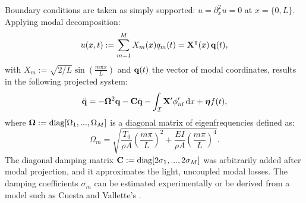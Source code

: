 Boundary conditions are taken as simply supported: $u = \partial_x^2 u = 0$ at $x = \{0, L\}$. Applying modal decomposition:
\begin{equation}\label{eq:ModalSystem}
u(x,t) := \sum_{m=1}^M X_m(x) q_m(t) = {\bf X}^\intercal(x) \, {\bf q}(t),
\end{equation}
with $X_m := \sqrt{2/L} \sin\left(\frac{m\pi x}{L}\right)$ and ${\bf q}(t)$ the vector of modal coordinates, results in the following projected system:
\begin{equation}
\ddot {\bf q} = -{\bf \Omega}^2{\bf q} - {\bf C}\dot{\bf q} - \int_{\mathcal I} {\bf X}' \phi^\prime_{nl}\,\mathrm dx + {\boldsymbol \eta} f(t),
\end{equation}
where ${\bf \Omega} := \text{diag}[\Omega_1,...,\Omega_M]$ is a diagonal matrix of eigenfrequencies defined as:
\begin{equation}
\Omega_m = \sqrt{\frac{T_0}{\rho A} \left(\frac{m\pi}{L}\right)^2 + \frac{EI}{\rho A} \left(\frac{m\pi}{L}\right)^4}.
\end{equation}
The diagonal damping matrix ${\bf C} := \text{diag}[2\sigma_1,...,2\sigma_M]$ was arbitrarily added after modal projection, and it approximates the light, uncoupled modal losses. The damping coefficients $\sigma_m$ can be estimated experimentally or be derived from a model such as Cuesta and Vallette's \cite{cuesta1996nonlinear}.

